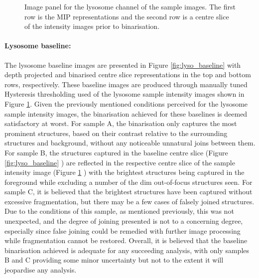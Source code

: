 \begin{figure}[ht!]
	\caption[Image panel of the lysosome sample intensity images used in binarisation.]{Image panel for the lysosome channel of the sample images. The first row is the MIP representations and the second row is a centre slice of the intensity images prior to binarisation.}
	\label{fig:lysosome_raw}
\end{figure}
\FloatBarrier
\paragraph{Lysosome baseline:} The lysosome baseline images are presented in Figure \ref{fig:lyso_baseline} with depth projected and binarised centre slice representations in the top and bottom rows, respectively. These baseline images are produced through manually tuned Hysteresis thresholding used of the lysosome sample intensity images shown in Figure \ref{fig:lysosome_raw}. Given the previously mentioned conditions perceived for the lysosome sample intensity images, the binarisation achieved for these baselines is deemed satisfactory at worst. For sample A, the binarisation only captures the most prominent structures, based on their contrast relative to the surrounding structures and background, without any noticeable unnatural joins between them. For sample B, the structures captured in the baseline centre slice (Figure \ref{fig:lyso_baseline} ) are reflected in the respective centre slice of the sample intensity image (Figure \ref{fig:lysosome_raw} ) with the brightest structures being captured in the foreground while excluding a number of the dim out-of-focus structures seen. For sample C, it is believed that the brightest structures have been captured without excessive fragmentation, but there may be a few cases of falsely joined structures. Due to the conditions of this sample, as mentioned previously, this was not unexpected, and the degree of joining presented is not to a concerning degree, especially since false joining could be remedied with further image processing while fragmentation cannot be restored. Overall, it is believed that the baseline binarisation achieved is adequate for any succeeding analysis, with only samples B and C providing some minor uncertainty but not to the extent it will jeopardise any analysis.

